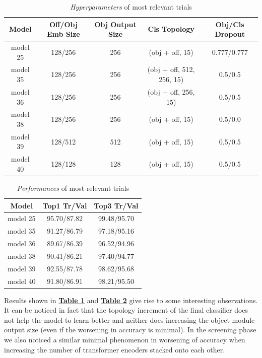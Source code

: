 \documentclass[12pt]{article}
\begin{document}
\begin{table}[ht!]
	    \centering
	    \scriptsize
	    \begin{tabular}{ |c|c|c|c|c| }
        \hline
        \textbf{Model} & \textbf{Off/Obj Emb Size} & \textbf{Obj Output Size} & \textbf{Cls Topology} & \textbf{Obj/Cls Dropout} \\
        \hline
        model 25 & 128/256 & 256 & (obj + off, 15) & 0.777/0.777 \\
        model 35 & 128/256 & 256 & (obj + off, 512, 256, 15) & 0.5/0.5 \\
        model 36 & 128/256 & 256 & (obj + off, 256, 15) & 0.5/0.5 \\
        model 38 & 128/256 & 256 & (obj + off, 15) & 0.5/0.0 \\
        model 39 & 128/512 & 512 & (obj + off, 15) & 0.5/0.5 \\
        model 40 & 128/128 & 128 & (obj + off, 15) & 0.5/0.5 \\
        \hline
        \end{tabular}
        \captionsetup{justification   = centering}
	    \caption{\textit{Hyperparameters} of most relevant trials}
	    \label{tb:firstlevel-hyper}
\end{table}

\begin{table}[ht!]
	    \centering
	    \scriptsize
	    \begin{tabular}{ |c|c|c| }
        \hline
        \textbf{Model} & \textbf{Top1 Tr/Val} & \textbf{Top3 Tr/Val}\\
        \hline
        model 25 & 95.70/87.82 & 99.48/95.70 \\
        model 35 & 91.27/86.79 & 97.18/95.16 \\
        model 36 & 89.67/86.39 & 96.52/94.96 \\
        model 38 & 90.41/86.21 & 97.40/94.77 \\
        model 39 & 92.55/87.78 & 98.62/95.68 \\
        model 40 & 91.80/86.91 & 98.21/95.50 \\
        \hline
        \end{tabular}
        \captionsetup{justification   = centering}
	    \caption{\textit{Performances} of most relevant trials}
	    \label{tb:firstlevel-results}
\end{table}
\pagebreak

Results shown in \hyperref[tb:firstlevel-hyper]{\textbf{Table \ref{tb:firstlevel-hyper}}} and \hyperref[tb:firstlevel-results]{\textbf{Table \ref{tb:firstlevel-results}}} give rise to some interesting observations. It can be noticed in fact that the topology increment of the final classifier does not help the model to learn better and neither does increasing the object module output size (even if the worsening in accuracy is minimal). In the screening phase we also noticed a similar minimal phenomenon in worsening of accuracy when increasing the number of transformer encoders stacked onto each other. 
\end{document}
